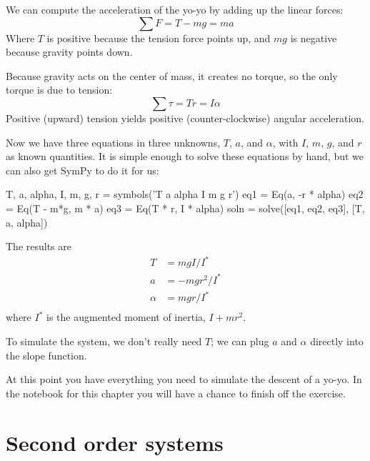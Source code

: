 \documentclass[12pt]{book}
\theoremstyle{exercise}
\newcommand\blankpage{%
    \null
    \thispagestyle{empty}%
    \addtocounter{page}{-1}%
    \newpage}
\begin{document}
We can compute the acceleration of the yo-yo by adding up the linear forces:
%
\[ \sum F = T - mg = ma \]
%
Where $T$ is positive because the tension force points up, and $mg$ is negative because gravity points down.

Because gravity acts on the center of mass, it creates no torque, so the only torque is due to tension:
%
\[ \sum \tau = T r = I \alpha \]
%
Positive (upward) tension yields positive (counter-clockwise) angular acceleration.

Now we have three equations in three unknowns, $T$, $a$, and $\alpha$, with $I$, $m$, $g$, and $r$ as known quantities.  It is simple enough to solve these equations by hand, but we can also get SymPy to do it for us:

\begin{python}
T, a, alpha, I, m, g, r = symbols('T a alpha I m g r')
eq1 = Eq(a, -r * alpha)
eq2 = Eq(T - m*g, m * a)
eq3 = Eq(T * r, I * alpha)
soln = solve([eq1, eq2, eq3], [T, a, alpha])
\end{python}

The results are
%
\begin{align*}
T      &= m g I / I^*   \\
a      &= -m g r^2 / I^* \\
\alpha &= m g r / I^*    \\
\end{align*}
%
where $I^*$ is the augmented moment of inertia, $I + m r^2$.

To simulate the system, we don't really need $T$; we can plug $a$ and $\alpha$ directly into the slope function.

At this point you have everything you need to simulate the descent of a yo-yo.  In the notebook for this chapter you will have a chance to finish off the exercise.


\chapter{Second order systems}








\backmatter
\printindex

\afterpage{\blankpage}
\end{document}
